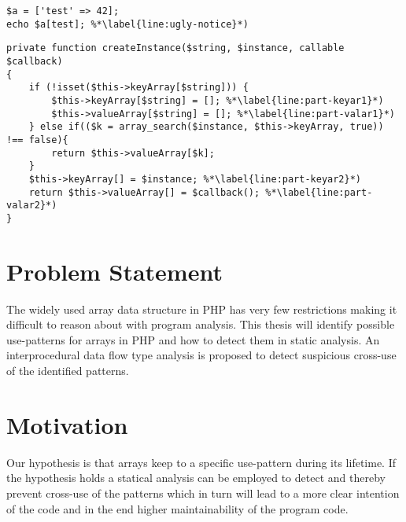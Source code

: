 \begin{program}
\centering 
\begin{lstlisting}
$a = ['test' => 42];
echo $a[test]; %*\label{line:ugly-notice}*)
\end{lstlisting}
\caption{Valid, but ugly, program \label{prog:ugly}}
\end{program}


\begin{program}
\centering 
\begin{lstlisting}
private function createInstance($string, $instance, callable $callback)
{
    if (!isset($this->keyArray[$string])) {
        $this->keyArray[$string] = []; %*\label{line:part-keyar1}*)
        $this->valueArray[$string] = []; %*\label{line:part-valar1}*)
    } else if(($k = array_search($instance, $this->keyArray, true)) !== false){
        return $this->valueArray[$k];
    }
    $this->keyArray[] = $instance; %*\label{line:part-keyar2}*)
    return $this->valueArray[] = $callback(); %*\label{line:part-valar2}*)
}
\end{lstlisting}
\caption{Other type}
\end{program}

\section{Problem Statement}
The widely used array data structure in PHP has very few restrictions making it difficult to reason about with program analysis. This thesis will identify possible use-patterns for arrays in PHP and how to detect them in static analysis. An interprocedural data flow type analysis is proposed to detect suspicious cross-use of the identified patterns.

\section{Motivation}
Our hypothesis is that arrays keep to a specific use-pattern during its lifetime. If the hypothesis holds a statical analysis can be employed to detect and thereby prevent cross-use of the patterns which in turn will lead to a more clear intention of the code and in the end higher maintainability of the program code.

